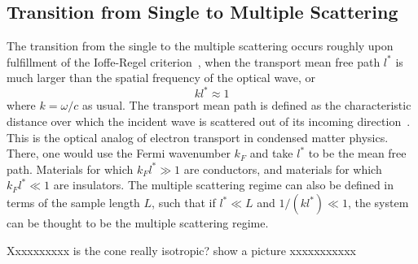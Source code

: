 \subsection{Transition from Single to Multiple Scattering}
The transition from the single to the multiple scattering occurs roughly upon
fulfillment of the Ioffe-Regel criterion~\cite{ioffe1960non}, when the
transport mean free path $l^*$ is much larger than the spatial frequency of
the optical wave, or
\begin{equation}
k l^* \approx 1
\end{equation}
where $k=\omega/c$ as usual.  The transport mean path is defined as the
characteristic distance over which the incident wave is scattered out of its
incoming direction~\cite{berkovits1994correlations}.  This is the optical
analog of electron transport in condensed matter physics.  There, one would
use the Fermi wavenumber $k_F$ and take $l^*$ to be the mean free path.
Materials for which $k_F l^* \gg 1$ are conductors, and materials for which
$k_F l^* \ll 1$ are insulators.  The multiple scattering regime can also be
defined in terms of the sample length $L$, such that if $l^* \ll L$ and $1/(k
l^*) \ll 1$, the system can be thought to be the multiple scattering regime.

Xxxxxxxxxx is the cone really isotropic?  show a picture xxxxxxxxxxx


